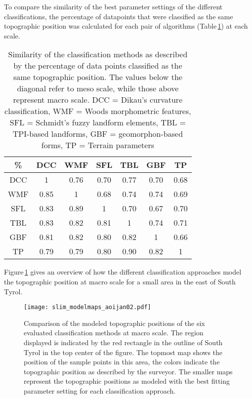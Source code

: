 \documentclass[preprint,12pt,authoryear]{elsarticle}
\begin{document}
To compare the similarity of the best parameter settings of the different classifications, the percentage of datapoints that were classified as the same topographic position was calculated for each pair of algorithms (Table\,\ref{table:similarity_matrix}) at each scale. 
\begin{table}[ht]
\caption{Similarity of the classification methods as described by the percentage of data points classified as the same topographic position. The values below the diagonal refer to meso scale, while those above represent macro scale. DCC = Dikau's curvature classification, WMF = Woods morphometric features, SFL = Schmidt's fuzzy landform elements, TBL = TPI-based landforms, GBF = geomorphon-based forms, TP = Terrain parameters}
\centering
\begin{tabular}{ccccccc}
  \hline
\%  & DCC & WMF &SFL &TBL & GBF & TP \\ 
  \hline
DCC &1 & 0.76 & 0.70 & 0.77 & 0.70 & 0.68 \\ 
WMF &0.85  & 1 & 0.68 & 0.74 & 0.74 & 0.69 \\ 
SFL & 0.83 & 0.89 & 1 & 0.70 & 0.67 & 0.70 \\ 
TBL & 0.83 &0.82  &0.81  & 1 & 0.74 & 0.71 \\ 
GBF &0.81  &0.82  & 0.80  & 0.82 & 1 & 0.66 \\ 
TP &0.79  &0.79  &0.80  &0.90  &0.82  & 1 \\ 
   \hline
\end{tabular}
\label{table:similarity_matrix}
\end{table}
Figure\,\ref{fig:resultmaps} gives an overview of how the different classification approaches model the topographic position at macro scale for a small area in the east of South Tyrol.
\begin{figure}
\texttt{[image: slim\_modelmaps\_aoijan02.pdf]}
\caption{Comparison of the modeled topographic positions of the six evaluated classification methods at macro scale. The region displayed is indicated by the red rectangle in the outline of South Tyrol in the top center of the figure. The topmost map shows the position of the sample points in this area, the colors indicate the topographic position as described by the surveyor. The smaller maps represent the topographic positions as modeled with the best fitting parameter setting for each classification approach.}
\label{fig:resultmaps}
\end{figure}
\end{document}
